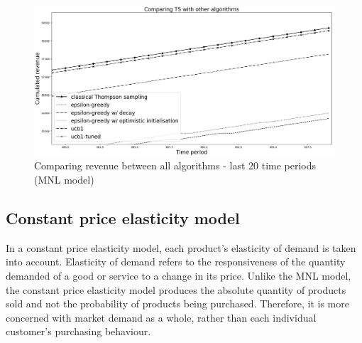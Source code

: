 \documentclass[a4paper]{article}
\begin{document}
\vfill
\begin{figure}[h]
	\centering
	\includegraphics[width=1.03\textwidth]{Figure_1-4.png}
	\caption{\label{fig:three}Comparing revenue between all algorithms - last 20 time periods (MNL model)}
\end{figure}

\newpage


\newpage
\subsection{Constant price elasticity model}
In a constant price elasticity model, each product's elasticity of demand is taken into account. Elasticity of demand refers to the responsiveness of the quantity demanded of a good or service to a change in its price. Unlike the MNL model, the constant price elasticity model produces the absolute quantity of products sold and not the probability of products being purchased. Therefore, it is more concerned with market demand as a whole, rather than each individual customer's purchasing behaviour.
\end{document}
